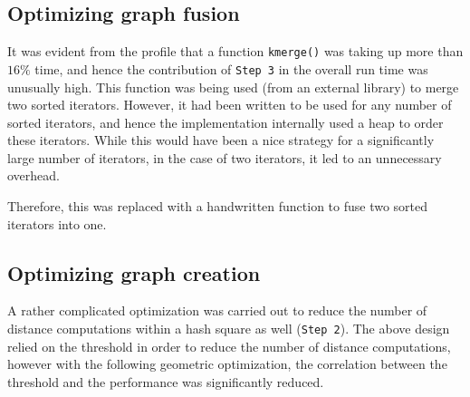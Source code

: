 \subsection{Optimizing graph fusion}
It was evident from the profile that a function \texttt{kmerge()} was taking up more than \begin{math} 16\% \end{math} time, and hence the contribution of \texttt{Step 3} in the overall run time was unusually high. This function was being used (from an external library) to merge two sorted iterators. However, it had been written to be used for any number of sorted iterators, and hence the implementation internally used a heap to order these iterators. While this would have been a nice strategy for a significantly large number of iterators, in the case of two iterators, it led to an unnecessary overhead.

Therefore, this was replaced with a handwritten function to fuse two sorted iterators into one.

\subsection{Optimizing graph creation}
A rather complicated optimization was carried out to reduce the number of distance computations within a hash square as well (\texttt{Step 2}). The above design relied on the threshold in order to reduce the number of distance computations, however with the following geometric optimization, the correlation between the threshold and the performance was significantly reduced.

